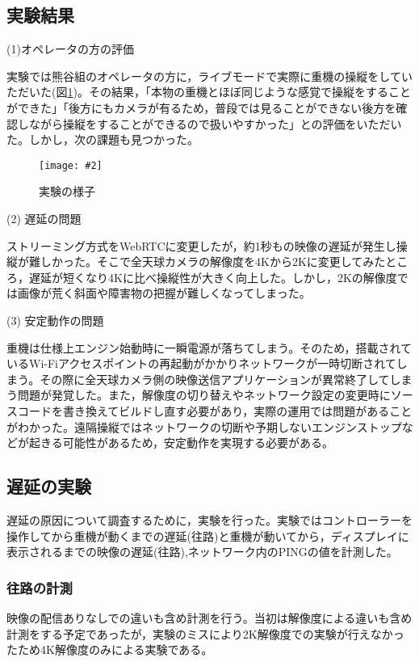\documentclass[a4paper,12pt]{jsarticle}
\newcommand{\figuref}[1]{図\ref{#1}}
\newcommand{\fig}[4][width=\textwidth]{
    \begin{figure}[!h]
    \begin{center}
    \texttt{[image: \#2]}
    \caption{#3}
    \label{#4}
    \vspace*{-1cm}
    \end{center}
    \end{figure}
}
\begin{document}
\subsection{実験結果}
\begin{description}
  \item[(1)オペレータの方の評価]
\end{description}
実験では熊谷組のオペレータの方に，ライブモードで実際に重機の操縦をしていただいた(\figuref{test})。その結果，「本物の重機とほぼ同じような感覚で操縦をすることができた」「後方にもカメラが有るため，普段では見ることができない後方を確認しながら操縦をすることができるので扱いやすかった」との評価をいただいた。しかし，次の課題も見つかった。
\fig[width=7cm]{image/test.jpg}{実験の様子}{test}

\begin{description}
  \item[(2) 遅延の問題]
\end{description}
ストリーミング方式をWebRTCに変更したが，約1秒もの映像の遅延が発生し操縦が難しかった。そこで全天球カメラの解像度を4Kから2Kに変更してみたところ，遅延が短くなり4Kに比べ操縦性が大きく向上した。しかし，2Kの解像度では画像が荒く斜面や障害物の把握が難しくなってしまった。

\begin{description}
  \item[(3) 安定動作の問題]
\end{description}
重機は仕様上エンジン始動時に一瞬電源が落ちてしまう。そのため，搭載されているWi-Fiアクセスポイントの再起動がかかりネットワークが一時切断されてしまう。その際に全天球カメラ側の映像送信アプリケーションが異常終了してしまう問題が発覚した。また，解像度の切り替えやネットワーク設定の変更時にソースコードを書き換えてビルドし直す必要があり，実際の運用では問題があることがわかった。遠隔操縦ではネットワークの切断や予期しないエンジンストップなどが起きる可能性があるため，安定動作を実現する必要がある。

\subsection{遅延の実験}
遅延の原因について調査するために，実験を行った。実験ではコントローラーを操作してから重機が動くまでの遅延(往路)と重機が動いてから，ディスプレイに表示されるまでの映像の遅延(往路),ネットワーク内のPINGの値を計測した。

\subsubsection{往路の計測}
映像の配信ありなしでの違いも含め計測を行う。当初は解像度による違いも含め計測をする予定であったが，実験のミスにより2K解像度での実験が行えなかったため4K解像度のみによる実験である。
\end{document}
